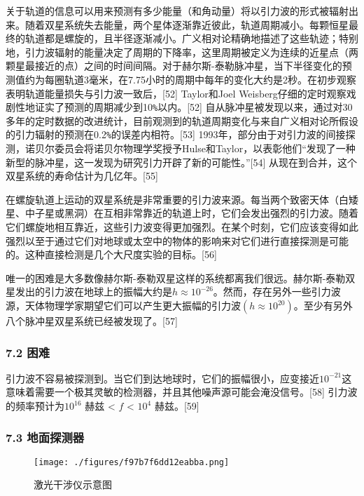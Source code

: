 关于轨道的信息可以用来预测有多少能量（和角动量）将以引力波的形式被辐射出来。随着双星系统失去能量，两个星体逐渐靠近彼此，轨道周期减小。每颗恒星最终的轨道都是螺旋的，且半径逐渐减小。广义相对论精确地描述了这些轨迹；特别地，引力波辐射的能量决定了周期的下降率，这里周期被定义为连续的近星点（两颗星最接近的点）之间的时间间隔。对于赫尔斯-泰勒脉冲星，当下半径变化的预测值约为每圈轨道3毫米，在7.75小时的周期中每年的变化大约是2秒。在初步观察表明轨道能量损失与引力波一致后，[52] Taylor和Joel Weisberg仔细的定时观察戏剧性地证实了预测的周期减少到10\verb|%|以内。[52] 自从脉冲星被发现以来，通过对30多年的定时数据的改进统计，目前观测到的轨道周期变化与来自广义相对论所假设的引力辐射的预测在0.2\verb|%|的误差内相符。[53] 1993年，部分由于对引力波的间接探测，诺贝尔委员会将诺贝尔物理学奖授予Hulse和Taylor，以表彰他们“发现了一种新型的脉冲星，这一发现为研究引力开辟了新的可能性。”[54] 从现在到合并，这个双星系统的寿命估计为几亿年。[55]

在螺旋轨道上运动的双星系统是非常重要的引力波来源。每当两个致密天体（白矮星、中子星或黑洞）在互相非常靠近的轨道上时，它们会发出强烈的引力波。随着它们螺旋地相互靠近，这些引力波变得更加强烈。在某个时刻，它们应该变得如此强烈以至于通过它们对地球或太空中的物体的影响来对它们进行直接探测是可能的。这种直接检测是几个大尺度实验的目标。[56]

唯一的困难是大多数像赫尔斯-泰勒双星这样的系统都离我们很远。赫尔斯-泰勒双星发出的引力波在地球上的振幅大约是$h\approx  10^{-26}$。然而，存在另外一些引力波源，天体物理学家期望它们可以产生更大振幅的引力波$(h \approx 10^{20})$。至少有另外八个脉冲星双星系统已经被发现了。[57]

\subsubsection{7.2 困难}

引力波不容易被探测到。当它们到达地球时，它们的振幅很小，应变接近$10^{-21}$这意味着需要一个极其灵敏的检测器，并且其他噪声源可能会淹没信号。[58] 引力波的频率预计为$10^{16}$ 赫兹 < $f$ < $10^{4}$ 赫兹。[59]

\subsubsection{7.3 地面探测器}

\begin{figure}[ht]
\centering
\texttt{[image: ./figures/f97b7f6dd12eabba.png]}
\caption{激光干涉仪示意图} \label{fig_YLB_10}
\end{figure}

